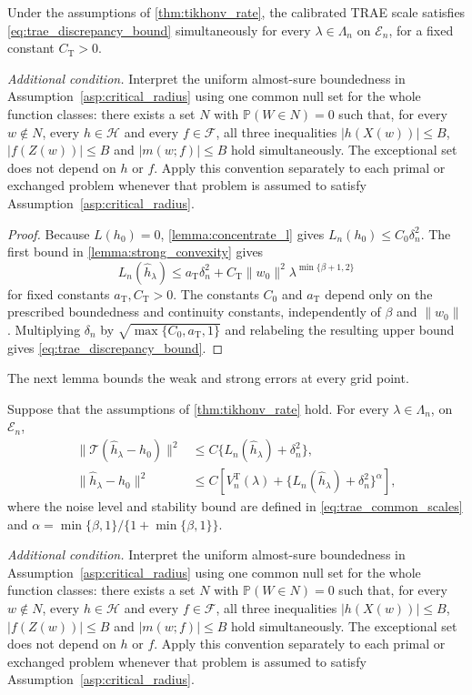 \begin{corollary}\label{cor:trae_discrepancy_bound}
Under the assumptions of \cref{thm:tikhonv_rate}, the calibrated TRAE scale satisfies \eqref{eq:trae_discrepancy_bound} simultaneously for every $\lambda\in\Lambda_n$ on $\mathcal E_n$, for a fixed constant $C_{\mathrm T}>0$.

\emph{Additional condition.} Interpret the uniform almost-sure boundedness in Assumption~\ref{asp:critical_radius} using one common null set for the whole function classes: there exists a set $N$ with $\mathbb P(W\in N)=0$ such that, for every $w\notin N$, every $h\in\mathcal H$ and every $f\in\mathcal F$, all three inequalities $|h(X(w))|\leqslant B$, $|f(Z(w))|\leqslant B$ and $|m(w;f)|\leqslant B$ hold simultaneously. The exceptional set does not depend on $h$ or $f$. Apply this convention separately to each primal or exchanged problem whenever that problem is assumed to satisfy Assumption~\ref{asp:critical_radius}.
\end{corollary}
\begin{proof}
Because $L(h_0)=0$, \cref{lemma:concentrate_l} gives
$L_n(h_0)\leqslant C_0\delta_n^2$. The first bound in
\cref{lemma:strong_convexity} gives
\[
L_n(\hat h_\lambda)
\leqslant a_{\mathrm T}\delta_n^2
+C_{\mathrm T}\|w_0\|^2\lambda^{\min\{\beta+1,2\}}
\]
for fixed constants $a_{\mathrm T},C_{\mathrm T}>0$. The constants $C_0$ and $a_{\mathrm T}$ depend only on the prescribed boundedness and continuity constants, independently of $\beta$ and $\|w_0\|$. Multiplying $\delta_n$ by $\sqrt{\max\{C_0,a_{\mathrm T},1\}}$ and relabeling the resulting upper bound gives \eqref{eq:trae_discrepancy_bound}.
\end{proof}


The next lemma bounds the weak and strong errors at every grid point.
\begin{lemma}\label{lemma:trae_accepted_bounds}
Suppose that the assumptions of \cref{thm:tikhonv_rate} hold. For every
$\lambda\in\Lambda_n$, on $\mathcal E_n$,
\begin{align*}
\|\mathcal T(\hat h_\lambda-h_0)\|^2
&\leqslant C \{L_n(\hat h_\lambda)+\delta_n^2\},\\
\|\hat h_\lambda-h_0\|^2
&\leqslant C\left[V_n^{\mathrm T}(\lambda)
+\{L_n(\hat h_\lambda)+\delta_n^2\}^\alpha\right],
\end{align*}
where the noise level and stability bound are defined in \eqref{eq:trae_common_scales} and
$\alpha=\min\{\beta,1\}/\{1+\min\{\beta,1\}\}$.

\emph{Additional condition.} Interpret the uniform almost-sure boundedness in Assumption~\ref{asp:critical_radius} using one common null set for the whole function classes: there exists a set $N$ with $\mathbb P(W\in N)=0$ such that, for every $w\notin N$, every $h\in\mathcal H$ and every $f\in\mathcal F$, all three inequalities $|h(X(w))|\leqslant B$, $|f(Z(w))|\leqslant B$ and $|m(w;f)|\leqslant B$ hold simultaneously. The exceptional set does not depend on $h$ or $f$. Apply this convention separately to each primal or exchanged problem whenever that problem is assumed to satisfy Assumption~\ref{asp:critical_radius}.
\end{lemma}

